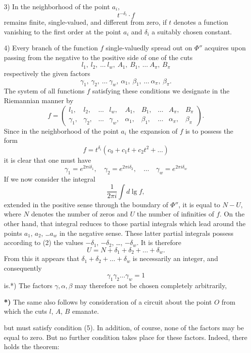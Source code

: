 \documentclass{article}
\begin{document}
3) In the neighborhood of the point $a_i$,
\[
t^{-\delta_i} \cdot f
\]
remains finite, single-valued, and different from zero, if $t$ denotes a function vanishing to the first order at the point $a_i$ and $\delta_i$ a suitably chosen constant.

4) Every branch of the function $f$ single-valuedly spread out on $\Phi''$ acquires upon passing from the negative to the positive side of one of the cuts
\[
l_1, \ l_2, \ \dots \ l_w, \ A_1, \ B_1, \ \dots \ A_\pi, \ B_\pi
\]
respectively the given factors
\[
\gamma_1, \ \gamma_2, \ \dots \ \gamma_w, \ \alpha_1, \ \beta_1, \ \dots \ \alpha_\pi, \ \beta_\pi.
\]
The system of all functions $f$ satisfying these conditions we designate in the Riemannian manner by
\[
f = \begin{pmatrix}
l_1, & l_2, & \dots & l_w, & A_1, & B_1, & \dots & A_\pi, & B_\pi \\
\gamma_1, & \gamma_2, & \dots & \gamma_w, & \alpha_1, & \beta_1, & \dots & \alpha_\pi, & \beta_\pi
\end{pmatrix}. \tag{1}
\]
Since in the neighborhood of the point $a_i$ the expansion of $f$ is to possess the form
\[
f = t^{\delta_i}(c_0 + c_1 t + c_2 t^2 + \dots) \tag{2}
\]
it is clear that one must have
\[
\gamma_1 = e^{2\pi i\delta_1}, \quad \gamma_2 = e^{2\pi i\delta_2}, \quad \dots \quad \gamma_w = e^{2\pi i\delta_w} \tag{3}
\]
If we now consider the integral
\[
\frac{1}{2\pi i}\int d\lg f,
\]
extended in the positive sense through the boundary of $\Phi''$, it is equal to $N - U$, where $N$ denotes the number of zeros and $U$ the number of infinities of $f$. On the other hand, that integral reduces to those partial integrals which lead around the points $a_1$, $a_2$, \dots $a_w$ in the negative sense. These latter partial integrals possess according to (2) the values $-\delta_1$, $-\delta_2$, \dots, $-\delta_w$. It is therefore
\[
U = N + \delta_1 + \delta_2 + \dots + \delta_w. \tag{4}
\]
From this it appears that $\delta_1 + \delta_2 + \dots + \delta_w$ is necessarily an integer, and consequently
\[
\gamma_1 \gamma_2 \dots \gamma_w = 1 \tag{5}
\]
is.*) The factors $\gamma, \alpha, \beta$ may therefore not be chosen completely arbitrarily,

\textbf{*)} The same also follows by consideration of a circuit about the point $O$ from which the cuts $l$, $A$, $B$ emanate.

but must satisfy condition (5). In addition, of course, none of the factors may be equal to zero. But no further condition takes place for these factors. Indeed, there holds the theorem:
\end{document}
